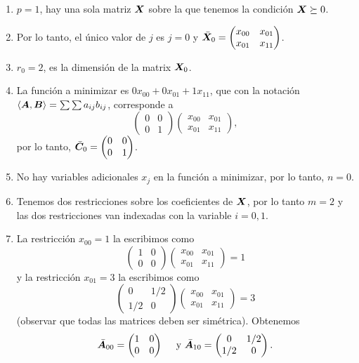 \documentclass[11pt]{article}
\begin{document}
\begin{enumerate}
\item $p = 1$, hay una sola matriz $\bm{X}$ sobre la que tenemos la condición $\bm{X} \succeq 0$.
\item Por lo tanto, el único valor de $j$ es $j = 0$ y $\bar {\bm{X}}_0 = \begin{pmatrix} x_{00} & x_{01} \\ x_{01} & x_{11} \end{pmatrix}$.
\item $r_0 = 2$, es la dimensión de la matrix $\bm{X}_0$.
\item La función a minimizar es $0 x_{00} + 0 x_{01} + 1 x_{11}$, que con la notación $\langle \bm{A}, \bm{B} \rangle = \sum \sum a_{ij} b_{ij}$, corresponde a
    $$
    \begin{pmatrix} 0 & 0 \\ 0 & 1 \end{pmatrix} \begin{pmatrix} x_{00} & x_{01} \\ x_{01} & x_{11} \end{pmatrix},
    $$
    por lo tanto, $\bar {\bm{C}}_0 = \begin{pmatrix} 0 & 0 \\ 0 & 1 \end{pmatrix}$.
\item No hay variables adicionales $x_j$ en la función a minimizar, por lo tanto, $n = 0$.
\item Tenemos dos restricciones sobre los coeficientes de $\bm{X}$, por lo tanto $m = 2$ y  las dos restricciones van indexadas con la variable $i = 0, 1$.
\item La restricción $x_{00} = 1$ la escribimos como
$$
\begin{pmatrix} 1 & 0 \\ 0 & 0 \end{pmatrix}
\begin{pmatrix} x_{00} & x_{01} \\ x_{01} & x_{11} \end{pmatrix} = 1
$$
y la restricción $x_{01} = 3$ la escribimos como
$$
\begin{pmatrix} 0 & 1/2 \\ 1/2 & 0 \end{pmatrix}
\begin{pmatrix} x_{00} & x_{01} \\ x_{01} & x_{11} \end{pmatrix} = 3
$$
(observar que todas las matrices deben ser simétrica).
Obtenemos
$$
\bar {\bm{A}}_{00} = \begin{pmatrix} 1 & 0 \\ 0 & 0 \end{pmatrix} \quad \text { y }
\bar {\bm{A}}_{10} = \begin{pmatrix} 0 & 1/2 \\ 1/2 & 0 \end{pmatrix}.
$$
\end{enumerate}
\end{document}
